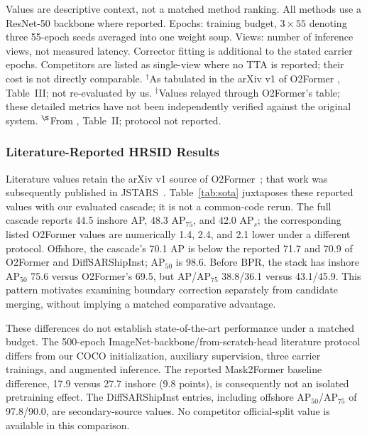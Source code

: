 \begin{table}[!t]
\begin{tabular}{lccccccccccc}
\bottomrule
\end{tabular}
\par\vspace{2pt}
\parbox{\textwidth}{\footnotesize Values are descriptive context, not a matched method ranking. All methods use a ResNet-50 backbone where reported. Epochs: training budget, $3\times55$ denoting three 55-epoch seeds averaged into one weight soup. Views: number of inference views, not measured latency. Corrector fitting is additional to the stated carrier epochs. Competitors are listed as single-view where no TTA is reported; their cost is not directly comparable. $^{\dagger}$As tabulated in the arXiv v1 of O2Former \cite{o2former2025}, Table~III; not re-evaluated by us. $^{\ddagger}$Values relayed through O2Former's table; these detailed metrics have not been independently verified against the original system. $^{\S}$From \cite{gaussheatmap2024}, Table~II; protocol not reported.}
\end{table}


\subsubsection{Literature-Reported HRSID Results}
Literature values retain the arXiv v1 source of O2Former~\cite{o2former2025}; that work was subsequently published in JSTARS~\cite{o2former2026}. Table~\ref{tab:sota} juxtaposes these reported values with our evaluated cascade; it is not a common-code rerun. The full cascade reports 44.5 inshore AP, 48.3 AP$_{75}$, and 42.0 AP$_s$; the corresponding listed O2Former values are numerically 1.4, 2.4, and 2.1 lower under a different protocol. Offshore, the cascade's 70.1 AP is below the reported 71.7 and 70.9 of O2Former and DiffSARShipInst; AP$_{50}$ is 98.6. Before BPR, the stack has inshore AP$_{50}$ 75.6 versus O2Former's 69.5, but AP/AP$_{75}$ 38.8/36.1 versus 43.1/45.9. This pattern motivates examining boundary correction separately from candidate merging, without implying a matched comparative advantage.

These differences do not establish state-of-the-art performance under a matched budget. The 500-epoch ImageNet-backbone/from-scratch-head literature protocol differs from our COCO initialization, auxiliary supervision, three carrier trainings, and augmented inference. The reported Mask2Former baseline difference, 17.9 versus 27.7 inshore (9.8 points), is consequently not an isolated pretraining effect. The DiffSARShipInst entries, including offshore AP$_{50}$/AP$_{75}$ of 97.8/90.0, are secondary-source values. No competitor official-split value is available in this comparison.


